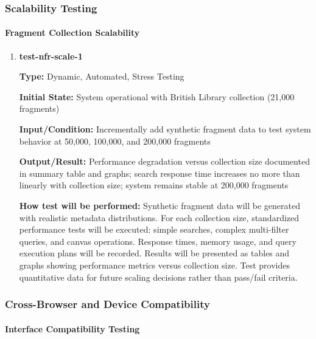 \documentclass[12pt, titlepage]{article}
\begin{document}
\subsubsection{Scalability Testing}

\paragraph{Fragment Collection Scalability}

\begin{enumerate}

\item \textbf{test-nfr-scale-1}

\textbf{Type:} Dynamic, Automated, Stress Testing
					
\textbf{Initial State:} System operational with British Library collection (21,000 fragments)
					
\textbf{Input/Condition:} Incrementally add synthetic fragment data to test system behavior at 50,000, 100,000, and 200,000 fragments
					
\textbf{Output/Result:} Performance degradation versus collection size documented in summary table and graphs; search response time increases no more than linearly with collection size; system remains stable at 200,000 fragments
					
\textbf{How test will be performed:} Synthetic fragment data will be generated with realistic metadata distributions. For each collection size, standardized performance tests will be executed: simple searches, complex multi-filter queries, and canvas operations. Response times, memory usage, and query execution plans will be recorded. Results will be presented as tables and graphs showing performance metrics versus collection size. Test provides quantitative data for future scaling decisions rather than pass/fail criteria.

\end{enumerate}

\subsubsection{Cross-Browser and Device Compatibility}

\paragraph{Interface Compatibility Testing}
\end{document}

